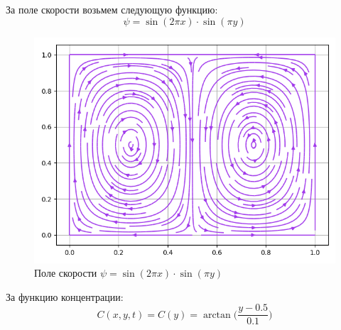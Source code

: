 \documentclass[a4paper, 14pt]{extarticle}
\begin{document}
		За поле скорости возьмем следующую функцию:
		\[ \psi = \sin(2\pi x) \cdot \sin(\pi y) \]
		
		\begin{figure}[H]
			\centering
			\includegraphics[width = .8\linewidth]{11.png}
			\caption[.] {Поле скорости $\psi = \sin(2\pi x) \cdot \sin(\pi y)$}
		\end{figure}
		
		За функцию концентрации:
		\[ C(x, y, t) = C(y) = \arctan{\Bigg(\dfrac{y-0.5}{0.1}\Bigg)} \]
			
\end{document}
